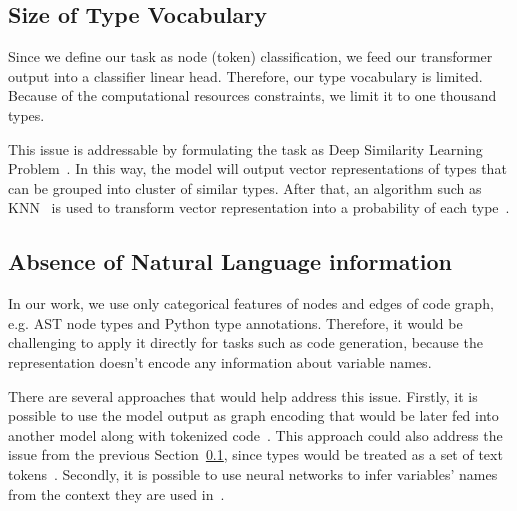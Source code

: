 \subsection{Size of Type Vocabulary}\label{subsec:size-of-type-vocabulary}

Since we define our task as node (token) classification, we feed our transformer output into a classifier linear head.
Therefore, our type vocabulary is limited.
Because of the computational resources constraints, we limit it to one thousand types.

This issue is addressable by formulating the task as Deep Similarity Learning Problem~\cite{chopra2005learning,liao2018tripletbased}.
In this way, the model will output vector representations of types that can be grouped into cluster of similar types.
After that, an algorithm such as KNN~\cite{knn} is used to transform vector representation into a probability of each type~\cite{allamanis2020typilus,mir_type4py_2021}.

\subsection{Absence of Natural Language information}\label{subsec:absence-of-natural-language-information}

In our work, we use only categorical features of nodes and edges of code graph, e.g. AST node types and Python type annotations.
Therefore, it would be challenging to apply it directly for tasks such as code generation,
because the representation doesn't encode any information about variable names.

There are several approaches that would help address this issue.
Firstly, it is possible to use the model output as graph encoding that would be later fed into another model along with tokenized code~\cite{tipirneni_structcoder_2022}.
This approach could also address the issue from the previous Section~\ref{subsec:size-of-type-vocabulary}, since types would be treated as a set of text tokens~\cite{peng2023generative}.
Secondly, it is possible to use neural networks to infer variables' names from the context they are used in~\cite{bavishi2018context2name}.
